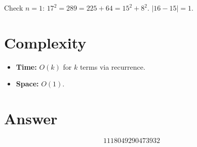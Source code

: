 \documentclass[12pt]{article}
\begin{document}
Check $n=1$: $17^2 = 289 = 225 + 64 = 15^2 + 8^2$. $|16 - 15| = 1$. \checkmark

\section{Complexity}
\begin{itemize}
\item \textbf{Time:} $O(k)$ for $k$ terms via recurrence.
\item \textbf{Space:} $O(1)$.
\end{itemize}

\section{Answer}

\[
\boxed{1118049290473932}
\]
\end{document}
